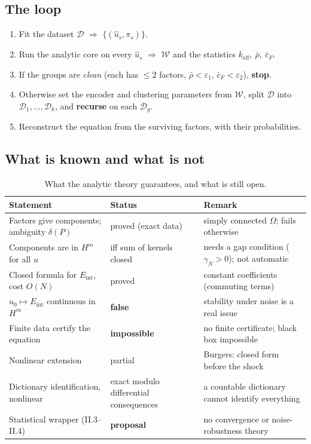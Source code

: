 \documentclass[11pt,a4paper]{article}
\newcommand{\Eint}{E_{\mathrm{int}}}
\begin{document}
\subsection{The loop}\label{sec:loop}
\begin{ideabox}[title={Algorithm (outer loop)}]
\begin{enumerate}[nosep,leftmargin=*]
\item Fit the dataset $\mathcal D$ $\Rightarrow$ $\{(\hat u_s,\pi_s)\}$.
\item Run the analytic core on every $\hat u_s$ $\Rightarrow$ $\mathcal W$ and the statistics $k_{\mathrm{eff}},\ \bar\rho,\ \bar c_F$.
\item If the groups are \emph{clean} (each has $\le2$ factors, $\bar\rho<\varepsilon_1$, $\bar c_F<\varepsilon_2$), \textbf{stop}.
\item Otherwise set the encoder and clustering parameters from $\mathcal W$, split $\mathcal D$ into $\mathcal D_1,\dots,\mathcal D_k$, and \textbf{recurse} on each $\mathcal D_g$.
\item Reconstruct the equation from the surviving factors, with their probabilities.
\end{enumerate}
\end{ideabox}

\subsection{What is known and what is not}
\begin{table}[!htb]
\centering\small
\begin{tabular}{@{}p{5.2cm}p{3.2cm}p{5.5cm}@{}}
\toprule
Statement & Status & Remark\\\midrule
Factors give components; ambiguity $\delta(P)$ & proved (exact data) & simply connected $\Omega$; fails otherwise\\
Components are in $H^m$ for all $u$ & iff sum of kernels closed & needs a gap condition ($\gamma_N>0$); not automatic\\
Closed formula for $\Eint$, cost $O(N)$ & proved & constant coefficients (commuting terms)\\
$u_0\mapsto\Eint$ continuous in $H^m$ & \textbf{false} & stability under noise is a real issue\\
Finite data certify the equation & \textbf{impossible} & no finite certificate; black box impossible\\
Nonlinear extension & partial & Burgers: closed form before the shock\\
Dictionary identification, nonlinear & exact modulo differential consequences & a countable dictionary cannot identify everything\\
Statistical wrapper (II.3--II.4) & \textbf{proposal} & no convergence or noise-robustness theory\\
\bottomrule
\end{tabular}
\caption{What the analytic theory guarantees, and what is still open.}
\end{table}
\end{document}
